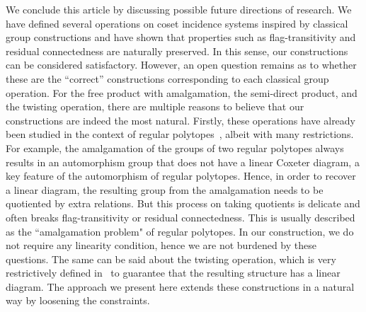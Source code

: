 \documentclass[11pt,letterpaper]{amsart}
\begin{document}
We conclude this article by discussing possible future directions of research. We have defined several operations on coset incidence systems inspired by classical group constructions and have shown that properties such as flag-transitivity and residual connectedness are naturally preserved. In this sense, our constructions can be considered satisfactory. However, an open question remains as to whether these are the “correct” constructions corresponding to each classical group operation. For the free product with amalgamation, the semi-direct product, and the twisting operation, there are multiple reasons to believe that our constructions are indeed the most natural. 
Firstly, these operations have already been studied in the context of regular polytopes~\cite[Chapters 4 and 8]{ARP}, albeit with many restrictions. For example, the amalgamation of the groups of two regular polytopes always results in an automorphism group that does not have a linear Coxeter diagram, a key feature of the automorphism of regular polytopes. Hence, in order to recover a linear diagram, the resulting group from the amalgamation needs to be quotiented by extra relations. But this process on taking quotients is delicate and often breaks flag-transitivity or residual connectedness. This is usually described as the ``amalgamation problem" of regular polytopes. In our construction, we do not require any linearity condition, hence we are not burdened by these questions. The same can be said about the twisting operation, which is very restrictively defined in~\cite{ARP} to guarantee that the resulting structure has a linear diagram.
The approach we present here extends these constructions in a natural way by loosening the constraints. 
\end{document}
